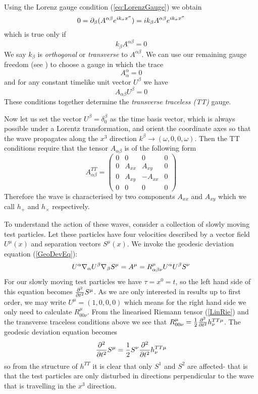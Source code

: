 Using the Lorenz gauge condition (\ref{eq:LorenzGauge}) we obtain
\[ 0={\partial}_\beta (A^{\alpha \beta} e^{i k_\sigma x^\sigma})=i k_\beta A^{\alpha \beta} e^{i k_\sigma x^\sigma} \]
which is true only if 
\begin{equation}
k_\beta A^{\alpha \beta}=0
\label{Transverse}
\end{equation}
We say $k_\beta$ is \textit{orthogonal} or \textit{transverse} to $A^{\alpha \beta}$. We can use our remaining gauge freedom (see \cite{Wald}) to choose a gauge in which the trace
\begin{equation}
A^\alpha_\alpha=0
\label{Traceless}
\end{equation}
and for any constant timelike unit vector $U^\beta$ we have 
\begin{equation}
A_{\alpha \beta} U^\beta = 0
\label{TT3}
\end{equation}
These conditions together determine the \textit{transverse traceless (TT)} gauge.

Now let us set the vector $U^\beta=\delta^\beta_0$ as the time basis vector, which is always possible under a Lorentz transformation, and orient the coordinate axes so that the wave propagates along the $x^3$ direction $k^\beta \rightarrow (\omega, 0, 0, \omega)$. Then the TT conditions require that  the tensor $A_{\alpha \beta}$ is of the following form
\begin{equation}
A^{TT}_{\alpha \beta} = \left( \begin{array}{cccc}
0 & 0 & 0 & 0 \\
0 & A_{xx} & A_{xy} & 0 \\
0 & A_{xy} & -A_{xx} & 0 \\
0 & 0 & 0 & 0
\end{array} \right)
\end{equation}
Therefore the wave is characterised by two components $A_{xx}$ and $A_{xy}$ which we call $h_+$ and $h_\times$ respectively.

To understand the action of these waves, consider a collection of slowly moving test particles. Let these particles have four velocities described by a vector field $U^\mu(x)$ and separation vectors $S^\mu (x)$. We invoke the geodesic deviation equation (\ref{GeoDevEq}):
\[U^{\alpha} {\nabla}_{\alpha} U^{\beta} {\nabla}_{\beta} S^\mu  =  A^\mu= R^\mu_{{\alpha} {\beta} \nu} U^{\alpha} U^{\beta} S^\nu \]
For our slowly moving test particles we have $\tau = x^0 = t$, so the left hand side of this equation becomes $\frac{{\partial}^2}{{\partial} t^2}S^\mu$. As we are only interested in results up to first order, we may write $U^\mu=(1,0,0,0)$ which means for the right hand side we only need to calculate $R^\mu_{00\nu}$. From the linearised Riemann tensor (\ref{LinRie}) and the transverse traceless conditions above we see that $R^\mu_{00\nu} = \frac{1}{2}\frac{{\partial}^2}{{\partial} t^2} h^{TT\mu}_{ \nu}$. The geodesic deviation equation becomes 
\begin{equation}\label{GDEwaveTT}
\frac{{\partial}^2}{{\partial} t^2}S^\mu = \frac{1}{2}S^\nu \frac{{\partial}^2}{{\partial} t^2} h^{TT\mu}_{ \nu}
\end{equation} 
so from the structure of $h^{TT}$ it is clear that only $S^1$ and $S^2$ are affected- that is that the test particles are only disturbed in directions perpendicular to the wave that is travelling in the $x^3$ direction. 

